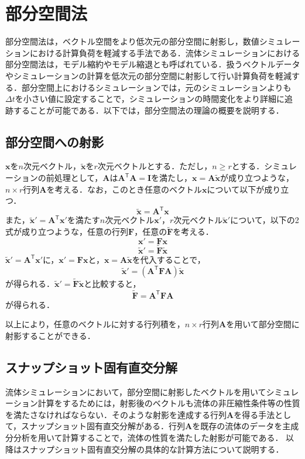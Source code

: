 \documentclass[a4j,12pt]{jreport}
\begin{document}
\section{部分空間法}\label{sec:Subspace}
部分空間法は，ベクトル空間をより低次元の部分空間に射影し，数値シミュレーションにおける計算負荷を軽減する手法である．流体シミュレーションにおける部分空間法は，モデル縮約やモデル縮退とも呼ばれている．扱うベクトルデータやシミュレーションの計算を低次元の部分空間に射影して行い計算負荷を軽減する．部分空間上におけるシミュレーションでは，元のシミュレーションよりも$\varDelta t$を小さい値に設定することで，シミュレーションの時間変化をより詳細に追跡することが可能である．以下では，部分空間法の理論の概要を説明する．

\subsection{部分空間への射影}
$\bm{x}$を$n$次元ベクトル，$\bm{\widetilde{x}} $を$r$次元ベクトルとする．ただし，$n \ge r$とする．シミュレーションの前処理として，$\bm{A}$は$\bm{A}^{\mathsf T} \bm{A} = \bm{I}$を満たし，$\bm{x} = \bm{A}\bm{\widetilde{x}} $が成り立つような，$n \times r$行列$\bm{A}$を考える．なお，このとき任意のベクトル$\bm{x}$について以下が成り立つ．
 	\[
 		\bm{\widetilde{x}}  = \bm{A}^{\mathsf T}\bm{x}
 	\]
	また，$\bm{\widetilde{x}}'  = \bm{A}^{\mathsf T}\bm{x}'$を満たす$n$次元ベクトル$\bm{x}'$，$r$次元ベクトル$\bm{\widetilde{x}}'$について，以下の2式が成り立つような，任意の行列$\bm{F}$，任意の$\bm{\widetilde{F}}$を考える．
	\[
		\bm{x}' = \bm{F}\bm{x}
	\]
	\[
		\bm{\widetilde{x}}'  = \bm{\widetilde{F}}\bm{\widetilde{x}} 
	\]
$\bm{\widetilde{x}}'  = \bm{A}^{\mathsf T}\bm{x}'$に，$\bm{x}' = \bm{F}\bm{x}$と，$\bm{x} = \bm{A}\bm{\widetilde{x}} $を代入することで，
	\[
		\bm{\widetilde{x}}'  = (\bm{A}^{\mathsf T}\bm{F}\bm{A})\bm{\widetilde{x}} 
	\]
	が得られる．$\bm{\widetilde{x}}'  = \bm{\widetilde{F}}\bm{\widetilde{x}} $と比較すると，
	\[
	\bm{\widetilde{F}} = \bm{A}^{\mathsf T}\bm{F}\bm{A}
	\]
	が得られる．
	
以上により，任意のベクトルに対する行列積を，$n \times r$行列$\bm{A}$を用いて部分空間に射影することができる．

\subsection{スナップショット固有直交分解}
流体シミュレーションにおいて，部分空間に射影したベクトルを用いてシミュレーション計算をするためには，射影後のベクトルも流体の非圧縮性条件等の性質を満たさなければならない．そのような射影を達成する行列$\bm{A}$を得る手法として，スナップショット固有直交分解がある．行列$\bm{A}$を既存の流体のデータを主成分分析を用いて計算することで，流体の性質を満たした射影が可能である．
以降はスナップショット固有直交分解の具体的な計算方法について説明する．
	
\end{document}
